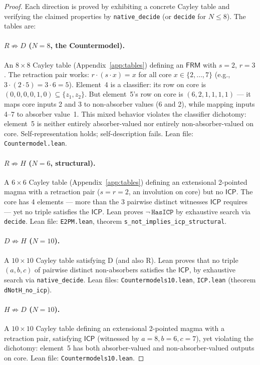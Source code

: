\documentclass[sigconf,screen]{acmart}
\newcommand{\dotop}{\cdot}
\newcommand{\FRM}{\textsf{FRM}}
\newcommand{\ICP}{\textsf{ICP}}
\theoremstyle{remark}
\begin{document}
\begin{proof}
Each direction is proved by exhibiting a concrete Cayley table and verifying the claimed properties by \texttt{native\_decide} (or \texttt{decide} for $N \leq 8$). The tables are:

\paragraph{$R \not\Rightarrow D$ ($N\!=\!8$, the Countermodel).}
An $8 \times 8$ Cayley table (Appendix~\ref{app:tables}) defining an $\FRM$ with $s = 2$, $r = 3$. The retraction pair works: $r \dotop (s \dotop x) = x$ for all core $x \in \{2,\ldots,7\}$ (e.g., $3 \dotop (2 \dotop 5) = 3 \dotop 6 = 5$). Element~4 is a classifier: its row on core is $(0,0,0,0,1,0) \subseteq \{z_1, z_2\}$. But element~5's row on core is $(6, 2, 1, 1, 1, 1)$ --- it maps core inputs 2 and 3 to non-absorber values (6 and 2), while mapping inputs 4--7 to absorber value~1. This mixed behavior violates the classifier dichotomy: element~5 is neither entirely absorber-valued nor entirely non-absorber-valued on core. Self-representation holds; self-description fails. Lean file: \texttt{Countermodel.lean}.

\paragraph{$R \not\Rightarrow H$ ($N\!=\!6$, structural).}
A $6 \times 6$ Cayley table (Appendix~\ref{app:tables}) defining an extensional 2-pointed magma with a retraction pair ($s = r = 2$, an involution on core) but no $\ICP$. The core has 4 elements --- more than the 3 pairwise distinct witnesses $\ICP$ requires --- yet no triple satisfies the $\ICP$. Lean proves $\neg\,\texttt{HasICP}$ by exhaustive search via \texttt{decide}. Lean file: \texttt{E2PM.lean}, theorem \texttt{s\_not\_implies\_icp\_structural}.

\paragraph{$D \not\Rightarrow H$ ($N\!=\!10$).}
A $10 \times 10$ Cayley table satisfying D (and also R). Lean proves that no triple $(a, b, c)$ of pairwise distinct non-absorbers satisfies the $\ICP$, by exhaustive search via \texttt{native\_decide}. Lean files: \texttt{Countermodels10.lean}, \texttt{ICP.lean} (theorem \texttt{dNotH\_no\_icp}).

\paragraph{$H \not\Rightarrow D$ ($N\!=\!10$).}
A $10 \times 10$ Cayley table defining an extensional 2-pointed magma with a retraction pair, satisfying $\ICP$ (witnessed by $a\!=\!8, b\!=\!6, c\!=\!7$), yet violating the dichotomy: element~5 has both absorber-valued and non-absorber-valued outputs on core. Lean file: \texttt{Countermodels10.lean}.


\end{proof}
\end{document}
